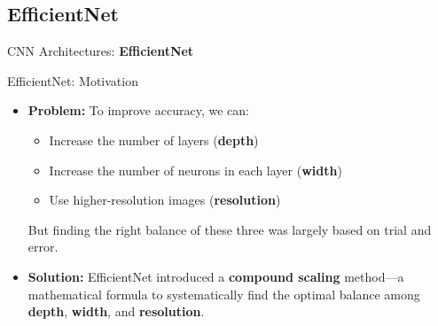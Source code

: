 \subsection{EfficientNet}
\begin{frame}{}
    \LARGE CNN Architectures: \textbf{EfficientNet}
\end{frame}

\begin{frame}{EfficientNet: Motivation}
    \begin{itemize}
        \item \textbf{Problem:} To improve accuracy, we can:
        \begin{itemize}
            \item Increase the number of layers (\textbf{depth})
            \item Increase the number of neurons in each layer (\textbf{width})
            \item Use higher-resolution images (\textbf{resolution})
        \end{itemize}
        But finding the right balance of these three was largely based on trial and error.
        
        \item \textbf{Solution:} EfficientNet introduced a \textbf{compound scaling} method—a mathematical formula to systematically find the optimal balance among \textbf{depth}, \textbf{width}, and \textbf{resolution}.
    \end{itemize}
\end{frame}

